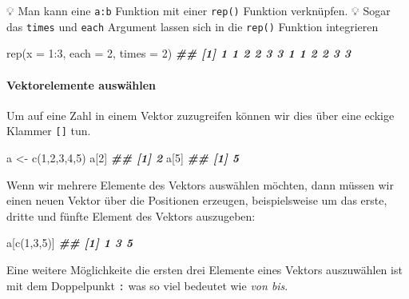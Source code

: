 \documentclass[
]{article}
\newenvironment{Shaded}{\begin{snugshade}}{\end{snugshade}}
\newcommand{\AttributeTok}[1]{\textcolor[rgb]{0.77,0.63,0.00}{#1}}
\newcommand{\DecValTok}[1]{\textcolor[rgb]{0.00,0.00,0.81}{#1}}
\newcommand{\DocumentationTok}[1]{\textcolor[rgb]{0.56,0.35,0.01}{\textbf{\textit{#1}}}}
\newcommand{\FunctionTok}[1]{\textcolor[rgb]{0.00,0.00,0.00}{#1}}
\newcommand{\NormalTok}[1]{#1}
\newcommand{\OtherTok}[1]{\textcolor[rgb]{0.56,0.35,0.01}{#1}}
\newcommand{\SpecialCharTok}[1]{\textcolor[rgb]{0.00,0.00,0.00}{#1}}
\begin{document}
💡 Man kann eine \texttt{a:b} Funktion mit einer \texttt{rep()} Funktion verknüpfen.
💡 Sogar das \texttt{times} und \texttt{each} Argument lassen sich in die \texttt{rep()} Funktion integrieren

\begin{Shaded}
\begin{Highlighting}[]
\FunctionTok{rep}\NormalTok{(}\AttributeTok{x =} \DecValTok{1}\SpecialCharTok{:}\DecValTok{3}\NormalTok{, }\AttributeTok{each =} \DecValTok{2}\NormalTok{, }\AttributeTok{times =} \DecValTok{2}\NormalTok{)}
\DocumentationTok{\#\#  [1] 1 1 2 2 3 3 1 1 2 2 3 3}
\end{Highlighting}
\end{Shaded}

\hypertarget{vektorelemente-auswuxe4hlen}{%
\paragraph{Vektorelemente auswählen}\label{vektorelemente-auswuxe4hlen}}

Um auf eine Zahl in einem Vektor zuzugreifen können wir dies über eine eckige Klammer \texttt{{[}{]}} tun.

\begin{Shaded}
\begin{Highlighting}[]
\NormalTok{a }\OtherTok{\textless{}{-}} \FunctionTok{c}\NormalTok{(}\DecValTok{1}\NormalTok{,}\DecValTok{2}\NormalTok{,}\DecValTok{3}\NormalTok{,}\DecValTok{4}\NormalTok{,}\DecValTok{5}\NormalTok{)}
\NormalTok{a[}\DecValTok{2}\NormalTok{]}
\DocumentationTok{\#\# [1] 2}
\NormalTok{a[}\DecValTok{5}\NormalTok{]}
\DocumentationTok{\#\# [1] 5}
\end{Highlighting}
\end{Shaded}

Wenn wir mehrere Elemente des Vektors auswählen möchten, dann müssen wir einen neuen Vektor über die Positionen erzeugen, beispielsweise um das erste, dritte und fünfte Element des Vektors auszugeben:

\begin{Shaded}
\begin{Highlighting}[]
\NormalTok{a[}\FunctionTok{c}\NormalTok{(}\DecValTok{1}\NormalTok{,}\DecValTok{3}\NormalTok{,}\DecValTok{5}\NormalTok{)]}
\DocumentationTok{\#\# [1] 1 3 5}
\end{Highlighting}
\end{Shaded}

Eine weitere Möglichkeite die ersten drei Elemente eines Vektors auszuwählen ist mit dem Doppelpunkt \texttt{:} was so viel bedeutet wie \emph{von bis}.
\end{document}
